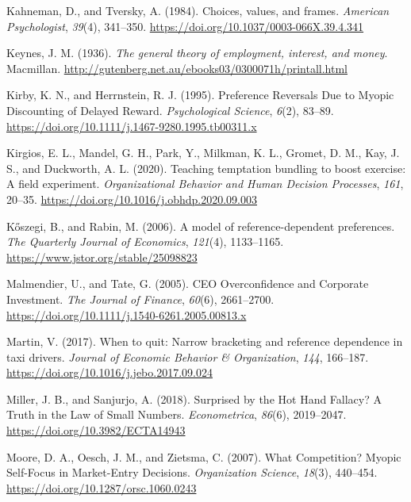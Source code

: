 \documentclass[
  letterpaper,
  DIV=11,
  numbers=noendperiod]{scrreprt}
\newlength{\cslhangindent}
\newlength{\cslentryspacingunit} %
\newenvironment{CSLReferences}[2] %
 {%
  \setlength{\parindent}{0pt}
  \ifodd #1
  \let\oldpar\par
  \def\par{\hangindent=\cslhangindent\oldpar}
  \fi
  \setlength{\parskip}{#2\cslentryspacingunit}
 }%
 {}
\begin{document}
\begin{CSLReferences}{1}{0}
\leavevmode{}%
Kahneman, D., and Tversky, A. (1984). Choices, values, and frames.
\emph{American Psychologist}, \emph{39}(4), 341--350.
\url{https://doi.org/10.1037/0003-066X.39.4.341}

\leavevmode{}%
Keynes, J. M. (1936). \emph{The general theory of employment, interest,
and money}. Macmillan.
\url{http://gutenberg.net.au/ebooks03/0300071h/printall.html}

\leavevmode{}%
Kirby, K. N., and Herrnstein, R. J. (1995). Preference Reversals Due to
Myopic Discounting of Delayed Reward. \emph{Psychological Science},
\emph{6}(2), 83--89.
\url{https://doi.org/10.1111/j.1467-9280.1995.tb00311.x}

\leavevmode{}%
Kirgios, E. L., Mandel, G. H., Park, Y., Milkman, K. L., Gromet, D. M.,
Kay, J. S., and Duckworth, A. L. (2020). Teaching temptation bundling to
boost exercise: A field experiment. \emph{Organizational Behavior and
Human Decision Processes}, \emph{161}, 20--35.
\url{https://doi.org/10.1016/j.obhdp.2020.09.003}

\leavevmode{}%
Kőszegi, B., and Rabin, M. (2006). A model of reference-dependent
preferences. \emph{The Quarterly Journal of Economics}, \emph{121}(4),
1133--1165. \url{https://www.jstor.org/stable/25098823}

\leavevmode{}%
Malmendier, U., and Tate, G. (2005). CEO Overconfidence and Corporate
Investment. \emph{The Journal of Finance}, \emph{60}(6), 2661--2700.
\url{https://doi.org/10.1111/j.1540-6261.2005.00813.x}

\leavevmode{}%
Martin, V. (2017). When to quit: Narrow bracketing and reference
dependence in taxi drivers. \emph{Journal of Economic Behavior \&
Organization}, \emph{144}, 166--187.
\url{https://doi.org/10.1016/j.jebo.2017.09.024}

\leavevmode{}%
Miller, J. B., and Sanjurjo, A. (2018). Surprised by the Hot Hand
Fallacy? A Truth in the Law of Small Numbers. \emph{Econometrica},
\emph{86}(6), 2019--2047. \url{https://doi.org/10.3982/ECTA14943}

\leavevmode{}%
Moore, D. A., Oesch, J. M., and Zietsma, C. (2007). What Competition?
Myopic Self-Focus in Market-Entry Decisions. \emph{Organization
Science}, \emph{18}(3), 440--454.
\url{https://doi.org/10.1287/orsc.1060.0243}


\end{CSLReferences}
\end{document}
